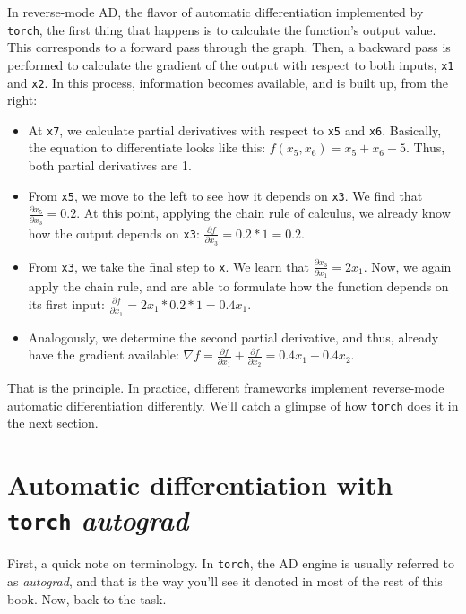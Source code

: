 \documentclass[
  letterpaper,
]{krantz}
\begin{document}
In reverse-mode AD, the flavor of automatic differentiation implemented
by \texttt{torch}, the first thing that happens is to calculate the
function's output value. This corresponds to a forward pass through the
graph. Then, a backward pass is performed to calculate the gradient of
the output with respect to both inputs, \texttt{x1} and \texttt{x2}. In
this process, information becomes available, and is built up, from the
right:

\begin{itemize}
\item
  At \texttt{x7}, we calculate partial derivatives with respect to
  \texttt{x5} and \texttt{x6}. Basically, the equation to differentiate
  looks like this: \(f(x_5, x_6) = x_5 + x_6 - 5\). Thus, both partial
  derivatives are 1.
\item
  From \texttt{x5}, we move to the left to see how it depends on
  \texttt{x3}. We find that \(\frac{\partial x_5}{\partial x_3} = 0.2\).
  At this point, applying the chain rule of calculus, we already know
  how the output depends on \texttt{x3}:
  \(\frac{\partial f}{\partial x_3} = 0.2 * 1 = 0.2\).
\item
  From \texttt{x3}, we take the final step to \texttt{x}. We learn that
  \(\frac{\partial x_3}{\partial x_1} = 2 x_1\). Now, we again apply the
  chain rule, and are able to formulate how the function depends on its
  first input:
  \(\frac{\partial f}{\partial x_1} = 2 x_1 * 0.2 * 1 = 0.4 x_1\).
\item
  Analogously, we determine the second partial derivative, and thus,
  already have the gradient available:
  \(\nabla f = \frac{\partial f}{\partial x_1} + \frac{\partial f}{\partial x_2} = 0.4 x_1 + 0.4 x_2\).
\end{itemize}

That is the principle. In practice, different frameworks implement
reverse-mode automatic differentiation differently. We'll catch a
glimpse of how \texttt{torch} does it in the next section.

\hypertarget{automatic-differentiation-with-torch-autograd}{%
\section{\texorpdfstring{Automatic differentiation with \texttt{torch}
\emph{autograd}}{Automatic differentiation with torch autograd}}\label{automatic-differentiation-with-torch-autograd}}

First, a quick note on terminology. In \texttt{torch}, the AD engine is
usually referred to as \emph{autograd}, and that is the way you'll see
it denoted in most of the rest of this book. Now, back to the task.
\end{document}
